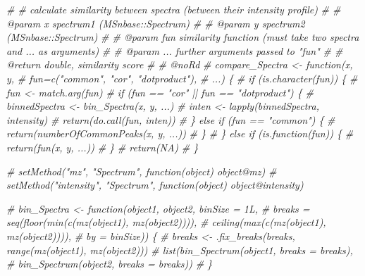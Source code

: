 \documentclass[
]{article}
\newenvironment{Shaded}{\begin{snugshade}}{\end{snugshade}}
\newcommand{\CommentTok}[1]{\textcolor[rgb]{0.56,0.35,0.01}{\textit{#1}}}
\begin{document}
\begin{Shaded}
\begin{Highlighting}[]
\CommentTok{\# \#\textquotesingle{} calculate similarity between spectra (between their intensity profile)}
\CommentTok{\# \#\textquotesingle{} @param x spectrum1 (MSnbase::Spectrum)}
\CommentTok{\# \#\textquotesingle{} @param y spectrum2 (MSnbase::Spectrum)}
\CommentTok{\# \#\textquotesingle{} @param fun similarity function (must take two spectra and ... as arguments)}
\CommentTok{\# \#\textquotesingle{} @param ... further arguments passed to "fun"}
\CommentTok{\# \#\textquotesingle{} @return double, similarity score}
\CommentTok{\# \#\textquotesingle{} @noRd}
\CommentTok{\# compare\_Spectra \textless{}{-} function(x, y,}
\CommentTok{\#                             fun=c("common", "cor", "dotproduct"),}
\CommentTok{\#                             ...) \{}
\CommentTok{\#   if (is.character(fun)) \{}
\CommentTok{\#     fun \textless{}{-} match.arg(fun)}
\CommentTok{\#     if (fun == "cor" || fun == "dotproduct") \{}
\CommentTok{\#       binnedSpectra \textless{}{-} bin\_Spectra(x, y, ...)}
\CommentTok{\#       inten \textless{}{-} lapply(binnedSpectra, intensity)}
\CommentTok{\#       return(do.call(fun, inten))}
\CommentTok{\#     \} else if (fun == "common") \{}
\CommentTok{\#       return(numberOfCommonPeaks(x, y, ...))}
\CommentTok{\#     \}}
\CommentTok{\#   \} else if (is.function(fun)) \{}
\CommentTok{\#     return(fun(x, y, ...))}
\CommentTok{\#   \}}
\CommentTok{\#   return(NA)}
\CommentTok{\# \}}


\CommentTok{\# setMethod("mz", "Spectrum", function(object) object@mz)}
\CommentTok{\# setMethod("intensity", "Spectrum", function(object) object@intensity)}

\CommentTok{\# bin\_Spectra \textless{}{-} function(object1, object2, binSize = 1L,}
\CommentTok{\#                         breaks = seq(floor(min(c(mz(object1), mz(object2)))),}
\CommentTok{\#                                      ceiling(max(c(mz(object1), mz(object2)))),}
\CommentTok{\#                                      by = binSize)) \{}
\CommentTok{\#     breaks \textless{}{-} .fix\_breaks(breaks, range(mz(object1), mz(object2)))}
\CommentTok{\#     list(bin\_Spectrum(object1, breaks = breaks),}
\CommentTok{\#          bin\_Spectrum(object2, breaks = breaks))}
\CommentTok{\# \}}


\end{Highlighting}
\end{Shaded}
\end{document}
